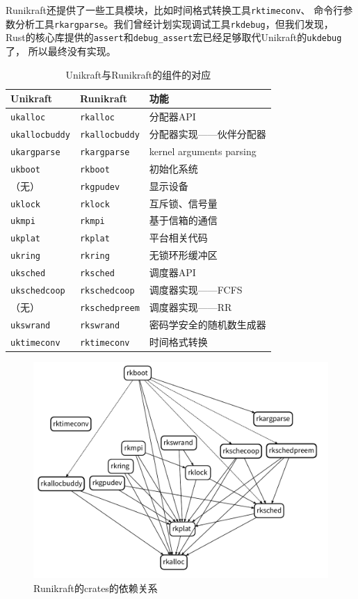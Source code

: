 \documentclass{../runikraft-report}
\begin{document}
Runikraft还提供了一些工具模块，比如时间格式转换工具\texttt{rktimeconv}、
命令行参数分析工具\texttt{rkargparse}。我们曾经计划实现调试工具\texttt{rkdebug}，但我们发现，
Rust的核心库提供的\texttt{assert}和\texttt{debug\_assert}宏已经足够取代Unikraft的\texttt{ukdebug}了，
所以最终没有实现。

\begin{table}[!hbt]
\caption{Unikraft与Runikraft的组件的对应}
\centering
\begin{tabular}{lll}
\hline
Unikraft&Runikraft&功能\\\hline
\texttt{ukalloc}&\texttt{rkalloc}&分配器API\\
\texttt{ukallocbuddy}&\texttt{rkallocbuddy}&分配器实现——伙伴分配器\\
\texttt{ukargparse}&\texttt{rkargparse}&kernel arguments parsing\\
\texttt{ukboot}&\texttt{rkboot}&初始化系统\\
（无）&\texttt{rkgpudev}&显示设备\\
\texttt{uklock}&\texttt{rklock}&互斥锁、信号量\\
\texttt{ukmpi}&\texttt{rkmpi}&基于信箱的通信\\
\texttt{ukplat}&\texttt{rkplat}&平台相关代码\\
\texttt{ukring}&\texttt{rkring}&无锁环形缓冲区\\
\texttt{uksched}&\texttt{rksched}&调度器API\\
\texttt{ukschedcoop}&\texttt{rkschedcoop}&调度器实现——FCFS\\
（无）&\texttt{rkschedpreem}&调度器实现——RR\\
\texttt{ukswrand}&\texttt{rkswrand}&密码学安全的随机数生成器\\
\texttt{uktimeconv}&\texttt{rktimeconv}&时间格式转换\\
\hline
\end{tabular}
\end{table}

\begin{figure}[!htb]
\centering
\includegraphics[width=\linewidth]{assets/crates-dependency.pdf}
\caption{Runikraft的crates的依赖关系}
\end{figure}
\end{document}

